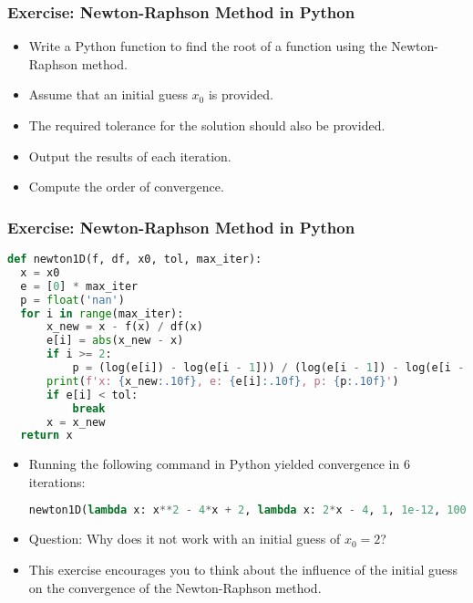 \begin{frame}[fragile]
    \frametitle{Exercise: Newton-Raphson Method in Python}

    \begin{itemize}
        \item Write a Python function to find the root of a function using the Newton-Raphson method.
        \item Assume that an initial guess \(x_0\) is provided.
        \item The required tolerance for the solution should also be provided.
        \item Output the results of each iteration.
        \item Compute the order of convergence.
    \end{itemize}
\end{frame}

\begin{frame}[fragile]
  \frametitle{Exercise: Newton-Raphson Method in Python}
  
  \begin{lstlisting}[language=Python]
def newton1D(f, df, x0, tol, max_iter):
  x = x0
  e = [0] * max_iter
  p = float('nan')
  for i in range(max_iter):
      x_new = x - f(x) / df(x)
      e[i] = abs(x_new - x)
      if i >= 2:
          p = (log(e[i]) - log(e[i - 1])) / (log(e[i - 1]) - log(e[i - 2]))
      print(f'x: {x_new:.10f}, e: {e[i]:.10f}, p: {p:.10f}')
      if e[i] < tol:
          break
      x = x_new
  return x
  \end{lstlisting}
  \begin{itemize}
      \item Running the following command in Python yielded convergence in 6 iterations:
      \begin{lstlisting}[language=Python]
newton1D(lambda x: x**2 - 4*x + 2, lambda x: 2*x - 4, 1, 1e-12, 100)
      \end{lstlisting}
      \item Question: Why does it not work with an initial guess of \( x_0 = 2 \)?
      \item This exercise encourages you to think about the influence of the initial guess on the convergence of the Newton-Raphson method.
  \end{itemize}
\end{frame}


